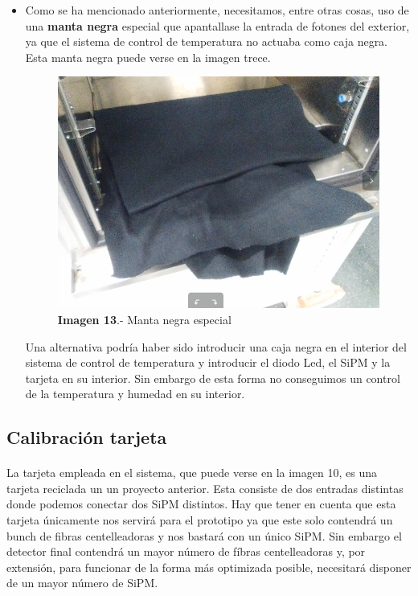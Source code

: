 \documentclass[11pt, a4paper]{article}
\begin{document}
\begin{itemize}
\item {} Como se ha mencionado anteriormente, necesitamos, entre otras cosas, uso de una \textbf{manta negra} especial que apantallase la entrada de fotones del exterior, ya que el sistema de control de temperatura no actuaba  como caja negra. Esta manta negra puede verse en la imagen trece.

\begin{figure}[hbtp]
\centering
\includegraphics[scale=0.2]{MantaNegra.png}
\caption{\textbf{Imagen 13}.- Manta negra especial}
\end{figure}


Una alternativa podría haber sido introducir una caja negra en el interior del sistema de control de temperatura y introducir el diodo Led, el SiPM y la tarjeta en su interior. Sin embargo de esta forma no conseguimos un control de la temperatura y humedad en su interior.

\end{itemize}



\newpage

\subsection {Calibración tarjeta}
\paragraph {}
La tarjeta empleada en el sistema, que puede verse en la imagen 10, es una tarjeta reciclada un un proyecto anterior. Esta consiste de dos entradas distintas donde podemos conectar dos SiPM distintos. Hay que tener en cuenta que esta tarjeta únicamente nos servirá para el prototipo ya que este solo contendrá un bunch de fibras centelleadoras y nos bastará con un único SiPM. Sin embargo el detector final contendrá un mayor número de fíbras centelleadoras y, por extensión, para funcionar de la forma más optimizada posible, necesitará disponer de un mayor número de SiPM.
\end{document}
